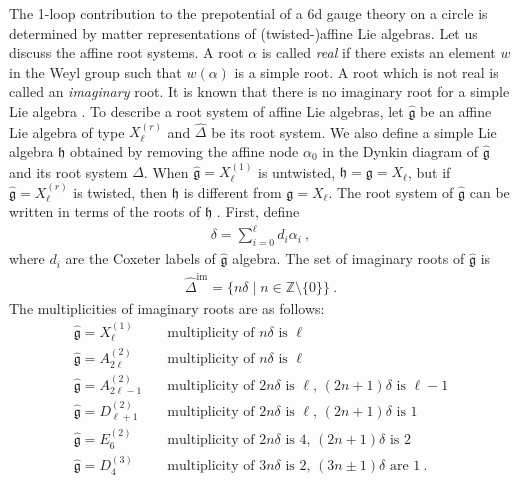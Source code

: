 The 1-loop contribution to the prepotential of a 6d gauge theory on a circle is determined by matter representations of (twisted-)affine Lie algebras. Let us discuss the affine root systems. A root $ \alpha $ is called {\it real} if there exists an element $ w $ in the Weyl group such that $ w(\alpha) $ is a simple root. A root which is not real is called an {\it imaginary} root. It is known that there is no imaginary root for a simple Lie algebra \cite{kac_infinite_2003}. To describe a root system of affine Lie algebras, let $ \hat{\mathfrak{g}} $ be an affine Lie algebra of type $ X_\ell^{(r)} $ and $ \hat{\Delta} $ be its root system. We also define a simple Lie algebra $ \mathfrak{h} $ obtained by removing the affine node $ \alpha_0 $ in the Dynkin diagram of $ \hat{\mathfrak{g}} $ and its root system $ \Delta $. When $ \hat{\mathfrak{g}} = X_\ell^{(1)} $ is untwisted, $ \mathfrak{h} = \mathfrak{g} = X_\ell $, but if $ \hat{\mathfrak{g}} = X_\ell^{(r)} $ is twisted, then $ \mathfrak{h} $ is different from $ \mathfrak{g} = X_\ell $. The root system of $ \hat{\mathfrak{g}} $ can be written in terms of the roots of $ \mathfrak{h} $ \cite{kac_infinite_2003}. First, define
\begin{align}
\delta = \sum_{i=0}^{\ell} d_i \alpha_i\ ,
\end{align}
where $ d_i $ are the Coxeter labels of $ \hat{\mathfrak{g}} $ algebra. The set of imaginary roots of $ \hat{\mathfrak{g}} $ is
\begin{align}
\hat{\Delta}^{\mathrm{im}} = \{ n \delta \mid n \in \mathbb{Z} \setminus \{0\} \} \ .
\end{align}
The multiplicities of imaginary roots are as follows: 
\begin{align}\label{eq:multiplicities-imaginary}
\hat{\mathfrak{g}} = X_\ell^{(1)} &\quad \text{multiplicity of } n\delta \text{ is } \ell\nonumber \\
\hat{\mathfrak{g}} = A_{2\ell}^{(2)} &\quad \text{multiplicity of } n\delta \text{ is } \ell\nonumber \\
\hat{\mathfrak{g}} = A_{2\ell-1}^{(2)} &\quad \text{multiplicity of } 2n\delta \text{ is } \ell \text{, } (2n+1)\delta \text{ is } \ell-1 \nonumber\\
\hat{\mathfrak{g}} = D_{\ell+1}^{(2)} &\quad \text{multiplicity of } 2n\delta \text{ is } \ell \text{, } (2n+1)\delta \text{ is } 1 \nonumber\\ 
\hat{\mathfrak{g}} = E_{6}^{(2)} &\quad \text{multiplicity of } 2n\delta \text{ is } 4 \text{, } (2n+1)\delta \text{ is } 2 \nonumber\\
\hat{\mathfrak{g}} = D_{4}^{(3)} &\quad \text{multiplicity of } 3n\delta \text{ is } 2 \text{, } (3n\pm 1)\delta \text{ are } 1\ .
\end{align}
